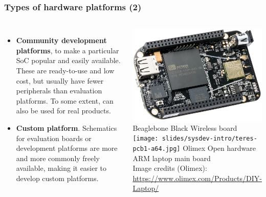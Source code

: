 \begin{frame}
  \frametitle{Types of hardware platforms (2)}
  \begin{columns}
  \begin{itemize}
  \item {\bf Community development platforms}, to make a
    particular SoC popular and easily available. These are
    ready-to-use and low cost, but usually have fewer peripherals than
    evaluation platforms. To some extent, can also be used for real
    products.
  \item {\bf Custom platform}. Schematics for evaluation boards or
    development platforms are more and more commonly freely available,
    making it easier to develop custom platforms.
  \end{itemize}
    \includegraphics[height=0.3\textheight]{../slides/beagleboneblack-board/beagleboneblack.png}
    \scriptsize
    Beaglebone Black Wireless board\\
    \vspace{0.5cm}
    \texttt{[image: slides/sysdev-intro/teres-pcb1-a64.jpg]}
    \scriptsize
    Olimex Open hardware ARM laptop main board\\
    \tiny
    Image credits (Olimex):\\
    \url{https://www.olimex.com/Products/DIY-Laptop/}
  \end{columns}
\end{frame}

